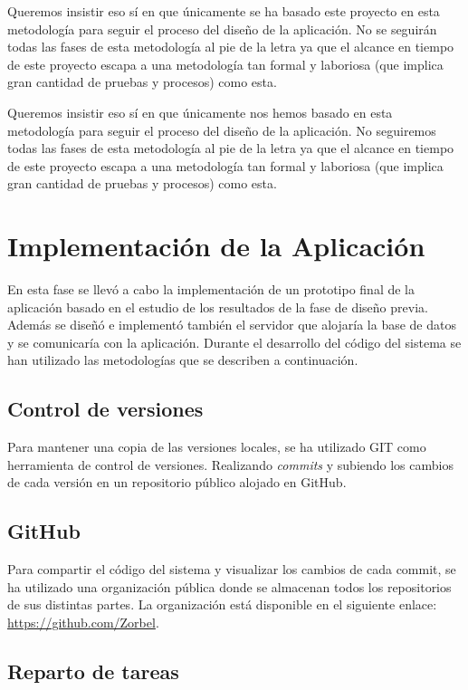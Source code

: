 Queremos insistir eso sí en que únicamente se ha basado este proyecto en esta metodología para seguir el proceso del diseño de la aplicación. No se seguirán todas las fases de esta metodología al pie de la letra ya que el alcance en tiempo de este proyecto escapa a una metodología tan formal y laboriosa (que implica gran cantidad de pruebas y procesos) como esta.

Queremos insistir eso sí en que únicamente nos hemos basado en esta metodología para seguir el proceso del diseño de la aplicación. No seguiremos todas las fases de esta metodología al pie de la letra ya que el alcance en tiempo de este proyecto escapa a una metodología tan formal y laboriosa (que implica gran cantidad de pruebas y procesos) como esta.

\section{Implementación de la Aplicación}

En esta fase se llevó a cabo la implementación de un prototipo final de la aplicación basado en el estudio de los resultados de la fase de diseño previa. Además se diseñó e implementó también el servidor que alojaría la base de datos y se comunicaría con la aplicación. Durante el desarrollo del código del sistema se han utilizado las metodologías que se describen a continuación.

\subsection{Control de versiones}

Para mantener una copia de las versiones locales, se ha utilizado GIT como herramienta de control de versiones. Realizando \textit{commits} y subiendo los cambios de cada versión en un repositorio público alojado en GitHub.

\subsection{GitHub}

Para compartir el código del sistema y visualizar los cambios de cada commit, se ha utilizado una organización pública donde se almacenan todos los repositorios de sus distintas partes. La organización está disponible en el siguiente enlace: \url{https://github.com/Zorbel}.

\subsection{Reparto de tareas}

